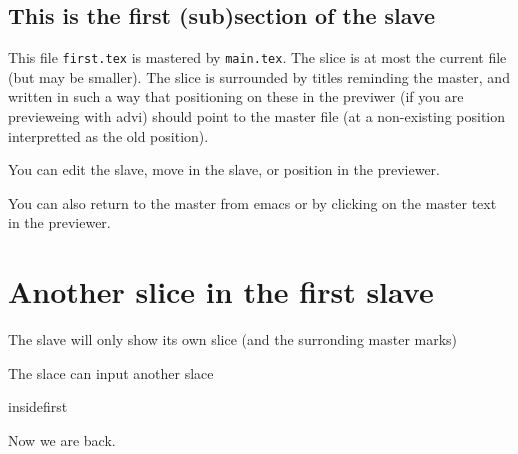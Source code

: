 
\subsection {This is the first (sub)section of the slave}

This file {\tt first.tex} is mastered by {\tt main.tex}.  The slice is at
most the current file (but may be smaller).  The slice is surrounded by
titles reminding the master, and written in such a way that positioning on
these in the previwer (if you are previeweing with advi) should point to the
master file (at a non-existing position interpretted as the old position).
 

You can edit the slave, move in the slave, or position in the previewer. 

You can also return to the master from emacs or by clicking on the master
text in the previewer. 

\section {Another slice in the first slave}

The slave will only show its own slice (and the surronding master marks)

The slace can input another slace

 {insidefirst}

Now we are back.

